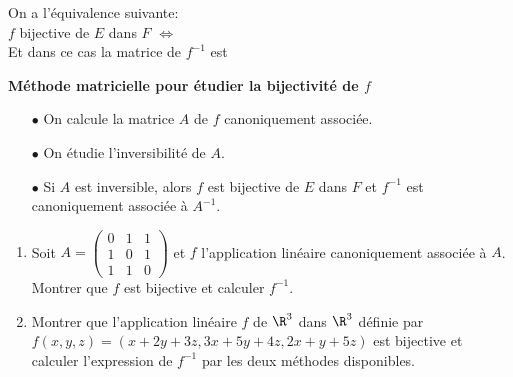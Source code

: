 \documentclass[a4paper, 11pt]{article}
\begin{document}
\vspace{0.4cm}


\begin{prop}
On a l'\'equivalence suivante:\vsec\\
$f$ bijective de $E$ dans $F$ $\Longleftrightarrow$ \dotfill \vsec\\
Et dans ce cas la matrice de $f^{-1}$ est \dotfill\vsec
\end{prop}
\vsec

\begin{dboxminipage}{0.7\textwidth}
\textbf{M\'ethode matricielle pour \'etudier la bijectivit\'e de $f$}
\begin{itemize}
\item[$\bullet$] On calcule la matrice $A$ de $f$ canoniquement associ\'ee.
\item[$\bullet$] On \'etudie l'inversibilit\'e de $A$.
\item[$\bullet$] Si $A$ est inversible, alors $f$ est bijective de $E$ dans $F$ et $f^{-1}$ est canoniquement associ\'ee \`{a} $A^{-1}$.
\end{itemize}
\end{dboxminipage}



{\footnotesize \begin{exercice}
\begin{enumerate}
\item Soit $A=\left(\begin{array}{lll} 0&1&1\\ 1&0&1\\ 1&1&0  \end{array}\right)$ et $f$ l'application lin\'eaire canoniquement associ\'ee \`a $A$. Montrer que $f$ est bijective et calculer $f^{-1}$.
\item Montrer que l'application lin\'eaire $f$ de $\R^3$ dans $\R^3$ d\'efinie par $f(x,y,z)=(x+2y+3z, 3x+5y+4z, 2x+y+5z)$ est bijective et calculer l'expression de $f^{-1}$ par les deux m\'ethodes disponibles.
\end{enumerate}
\end{exercice}
}

\vspace{0.4cm}
\end{document}
